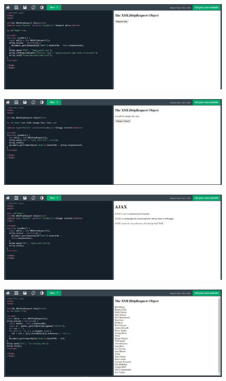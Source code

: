 \documentclass{article}
\begin{document}
\begin{itemize}
\begin{figure}[H]
			\centering
			\includegraphics[width=1.0\textwidth,keepaspectratio]{img/L8.jpg}
		\end{figure}
		\begin{figure}[H]
			\centering
			\includegraphics[width=1.0\textwidth,keepaspectratio]{img/L9.jpg}
		\end{figure}
		\begin{figure}[H]
			\centering
			\includegraphics[width=1.0\textwidth,keepaspectratio]{img/L10.jpg}
		\end{figure}
		\begin{figure}[H]
			\centering
			\includegraphics[width=1.0\textwidth,keepaspectratio]{img/L11.jpg}

\end{figure}
\end{itemize}
\end{document}
